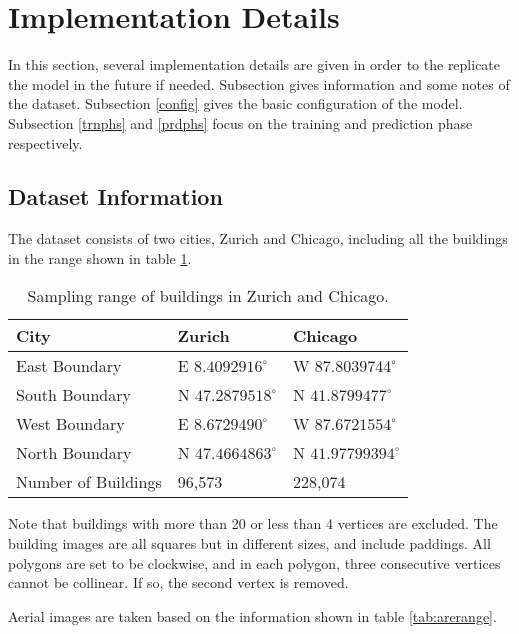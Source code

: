 \section{Implementation Details}\label{impdet}

In this section, several implementation details are given in order to the replicate the model in the future if needed. Subsection \label{datainfo} gives information and some notes of the dataset. Subsection \ref{config} gives the basic configuration of the model. Subsection \ref{trnphs} and \ref{prdphs} focus on the training and prediction phase respectively.

\subsection{Dataset Information}\label{datainfo}

The dataset consists of two cities, Zurich and Chicago, including all the buildings in the range shown in table \ref{tab:bldrange}.

\begin{table}[!h]
	\centering
	\caption[Sampling range of buildings in Zurich and Chicago]{Sampling range of buildings in Zurich and Chicago.}
	\label{tab:bldrange}
	\begin{tabular}{l|l|l}
	\hline
	City & Zurich & Chicago \\ \hline
	East Boundary & E $8.4092916^\circ$ & W $87.8039744^\circ$ \\
	South Boundary & N $47.2879518^\circ$ & N $41.8799477^\circ$ \\
	West Boundary & E $8.6729490^\circ$ & W $87.6721554^\circ$ \\
	North Boundary & N $47.4664863^\circ$ & N $41.97799394^\circ$ \\
	\hline
	Number of Buildings & 96,573 & 228,074 \\
	\hline
	\end{tabular}
\end{table}

Note that buildings with more than 20 or less than 4 vertices are excluded. The building images are all squares but in different sizes, and include paddings. All polygons are set to be clockwise, and in each polygon, three consecutive vertices cannot be collinear. If so, the second vertex is removed.

Aerial images are taken based on the information shown in table \ref{tab:arerange}.

